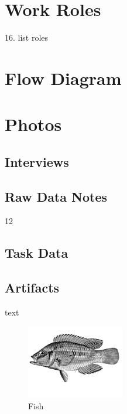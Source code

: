 \documentclass[12pt]{article} %
\begin{document}

\section{Work Roles} %
16. list roles

\section{Flow Diagram}


\section{Photos} %


\subsection{Interviews} %

\subsection{Raw Data Notes} %
12

\subsection{Task Data} %

\subsection{Artifacts} %

text
\begin{figure} %
  \begin{center}
    \includegraphics[width=0.38\textwidth]{fish}
  \end{center}
  \caption{Fish}
\end{figure}
\end{document}
